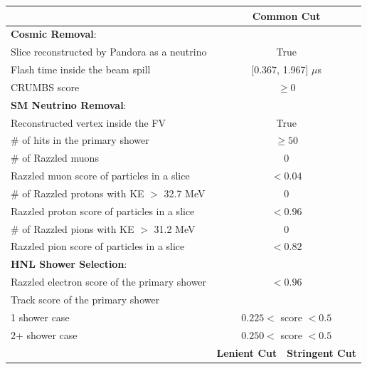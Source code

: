 \begin{table}[htbp!]
\centering
\begin{center}
\begin{tabular}{| p{7.75cm} | m{3.25cm} | m{3.25cm} |} 
 \hline
  & \multicolumn{2}{c|}{\textbf{Common Cut}} \\ [1ex] 
 \hline
 \textbf{Cosmic Removal}: & \multicolumn{2}{c|}{} \\ [1ex] 
 Slice reconstructed by Pandora as a neutrino & \multicolumn{2}{c|}{True} \\ 
 Flash time inside the beam spill & \multicolumn{2}{c|}{[0.367, 1.967] $\mu$s} \\ 
 CRUMBS score  & \multicolumn{2}{c|}{$\geq 0$} \\ [1ex] 
 \hline
 \textbf{SM Neutrino Removal}: & \multicolumn{2}{c|}{} \\ [1ex] 
 Reconstructed vertex inside the FV & \multicolumn{2}{c|}{True} \\
 \# of hits in the primary shower & \multicolumn{2}{c|}{$\geq 50$} \\ [1ex]
 \# of Razzled muons & \multicolumn{2}{c|}{0} \\
 Razzled muon score of particles in a slice & \multicolumn{2}{c|}{$< 0.04$} \\ [1ex]
 \# of Razzled protons with KE $>$ 32.7 MeV & \multicolumn{2}{c|}{0} \\
 Razzled proton score of particles in a slice & \multicolumn{2}{c|}{$< 0.96$} \\ [1ex]
 \# of Razzled pions with KE $>$ 31.2 MeV & \multicolumn{2}{c|}{0} \\
 Razzled pion score of particles in a slice & \multicolumn{2}{c|}{$< 0.82$} \\ [1ex]
 \hline
 \textbf{HNL Shower Selection}: & \multicolumn{2}{c|}{} \\ [1ex] 
 Razzled electron score of the primary shower & \multicolumn{2}{c|}{$< 0.96$} \\ [1ex]
 Track score of the primary shower & \multicolumn{2}{c|}{} \\
 \hspace{0.5cm}1 shower case & \multicolumn{2}{c|}{$0.225 <$ score $< 0.5$} \\
 \hspace{0.5cm}2+ shower case & \multicolumn{2}{c|}{$0.250 <$ score $< 0.5$} \\
 \cline{2-3}
 & \multicolumn{1}{c|}{\textbf{Lenient Cut}}  & \multicolumn{1}{c|}{\textbf{Stringent Cut}} \\  

\end{tabular}
\end{center}
\end{table}
